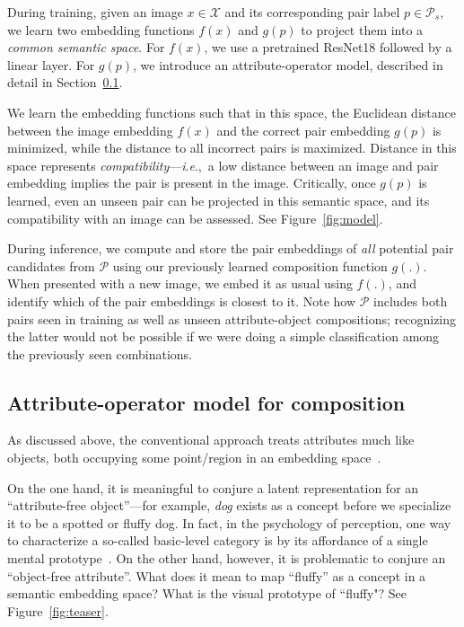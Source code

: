 \documentclass[runningheads]{llncs}
\newcommand{\ie}{\textit{i}.\textit{e}.,~}
\newcommand{\reffig}[1]{Figure~\ref{#1}}
\newcommand{\refsec}[1]{Section~\ref{#1}}
\begin{document}
During training, given an image $x \in \mathcal{X}$ and its corresponding pair label $p \in \mathcal{P}_s$, we learn two embedding functions $f(x)$ and $g(p)$ to project them into a \emph{common semantic space}.  
For $f(x)$, we use a pretrained ResNet18 \cite{he2016deep} followed by a linear layer. For $g(p)$, we introduce an attribute-operator model, described in detail in \refsec{sec:attr_embedding}.

We learn the embedding functions such that in this space, the Euclidean distance between the image embedding $f(x)$ and the correct pair embedding $g(p)$ is minimized, while the distance to all incorrect pairs is maximized.
Distance in this space represents \emph{compatibility}---\ie a low distance between an image and pair embedding implies the pair is present in the image.  Critically, once $g(p)$ is learned, even an unseen pair can be projected in this semantic space, and its compatibility with an image can be assessed.  See \reffig{fig:model}.

During inference, we compute and store the pair embeddings of \emph{all}  potential pair candidates from $\mathcal{P}$ using our previously learned composition function $g(.)$. When presented with a new image, we embed it as usual using $f(.)$, and identify which of the pair embeddings is closest to it. Note how $\mathcal{P}$ includes both pairs seen in training as well as unseen attribute-object compositions; 
recognizing the latter would not be possible if we were doing a simple classification among the previously seen combinations.

\vspace*{-0.1in}
\subsection{Attribute-operator model for composition} \label{sec:attr_embedding}

As discussed above, the conventional approach treats attributes much like objects, both occupying some point/region in an embedding space~\cite{siddiquie-feris-cvpr2011,walk-learn-cvpr2016,face-attributes-iccv2015,yongjae-stn,lu-feris-cvpr2017,su-eccv2016,dinesh-cvpr2014,elhoseiny-cvpr2015}.

On the one hand, it is meaningful to conjure a latent representation for an ``attribute-free object''---for example, \emph{dog} exists as a concept before we specialize it to be a spotted or fluffy dog.  In fact, in the psychology of perception, one way to characterize a so-called basic-level category is by its affordance of a single mental prototype~\cite{rosch1976basic}.  
On the other hand, however, it is problematic to conjure an ``object-free attribute''.  What does it mean to map ``fluffy'' as a concept in a semantic embedding space?  What is the visual prototype of ``fluffy"?  See Figure~\ref{fig:teaser}.
\end{document}
